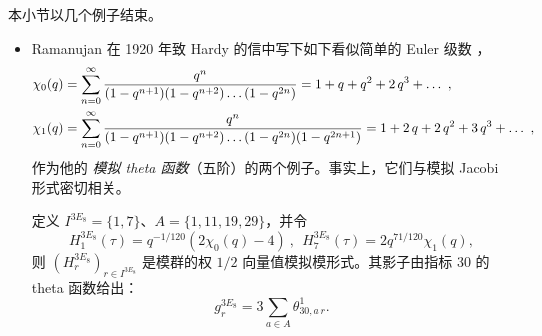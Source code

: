 \documentclass[11pt,a4paper,fontset=windows]{ctexart}
\numberwithin{equation}{section}
\def\t{\tau}
\newcommand{\ex}{\operatorname{e}} %
\newcommand{\be}{\begin{equation}}
\newcommand{\ee}{\end{equation}}
\begin{document}
本小节以几个例子结束。
\begin{itemize}
\item
Ramanujan 在 1920 年致 Hardy 的信中写下如下看似简单的 Euler 级数 \cite{MR2280843}，
{\footnotesize
\begin{align}\notag
\chi_0(q) &=\sum_{n=0}^{\infty} {q^n \over (1-q^{n+1})(1-q^{n+2})\dots (1-q^{2n})}  = 1+ q+ q^2 +2 \,q^3 +\dots~,\\\notag
  \chi_1(q) &=\sum_{n=0}^{\infty} {q^n \over (1-q^{n+1})(1-q^{n+2})\dots (1-q^{2n}) (1-q^{2n+1})}  = 1+2\, q+ 2\,q^2 +3 \,q^3 +\dots~,
\end{align}
}
作为他的 {\em 模拟 theta 函数}（五阶）的两个例子。事实上，它们与模拟 Jacobi 形式密切相关。


定义 $I^{3E_8} =\{1,7\}$、$A=\{1,11,19,29\}$，并令
\be\label{eqn:3E8}
H_1^{3E_8}(\t) = q^{-1/120}(2  \chi_0(q)  -4)~, ~~H_7^{3E_8}(\t) = 2  q^{71/120} \chi_1(q) , 
\ee  
则 $(H_r^{3E_8})_{r\in I^{3E_8}}$ 是模群的权 $1/2$ 向量值模拟模形式。其影子由指标 30 的 theta 函数给出：
\be
g_r ^{3E_8}= 3 \sum_{a\in A} \theta_{30,a\,r}^{1}. 
\ee




\end{itemize}
\end{document}

